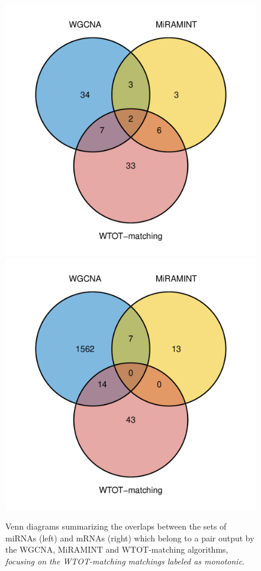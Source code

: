 \begin{figure}
  \centering
  \includegraphics[width=.45\textwidth]{images/miRNA_striatum_monot.pdf}
  \includegraphics[width=.45\textwidth]{images/mRNA_striatum_monot.pdf}
  \caption{Venn diagrams summarizing  the overlaps between the  sets of miRNAs
    (left)  and mRNAs  (right) which  belong to  a pair  output by  the WGCNA,
    MiRAMINT   and   WTOT-matching   algorithms,   \textit{focusing   on   the
      WTOT-matching matchings labeled as monotonic}.}
  \label{fig:venn:monotonic}
\end{figure}


